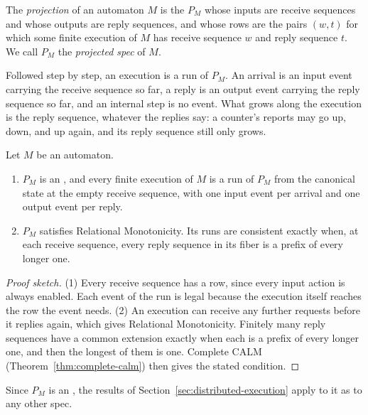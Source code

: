 \begin{definition}
\label{def:projection}
The \emph{projection} of an automaton $M$ is the \spectype $P_M$ whose inputs
are receive sequences and whose outputs are reply sequences, and whose rows
are the pairs $(w,t)$ for which some finite execution of $M$ has receive
sequence $w$ and reply sequence $t$.  We call $P_M$ the \emph{projected spec}
of $M$.
\end{definition}

Followed step by step, an execution is a run of $P_M$.  An arrival is an input
event carrying the receive sequence so far, a reply is an output event carrying
the reply sequence so far, and an internal step is no event.  What grows along
the execution is the reply sequence, whatever the replies say: a counter's
reports may go up, down, and up again, and its reply sequence still only
grows.

\begin{proposition}[Projection]
\label{prop:projection}
Let $M$ be an automaton.
\begin{enumerate}
  \item $P_M$ is an \spectype, and every finite execution of $M$ is a run of
        $P_M$ from the canonical state at the empty receive sequence, with
        one input event per arrival and one output event per reply.
  \item $P_M$ satisfies Relational Monotonicity.  Its runs are consistent
        exactly when, at each receive sequence, every reply sequence in its
        fiber is a prefix of every longer one.
\end{enumerate}
\end{proposition}

\begin{proof}[Proof sketch]
(1) Every receive sequence has a row, since every input action is always
enabled.  Each event of the run is legal because the execution itself reaches
the row the event needs.  (2) An execution can receive any further requests
before it replies again, which gives Relational Monotonicity.  Finitely many
reply sequences have a common extension exactly when each is a prefix of every
longer one, and then the longest of them is one.  Complete CALM
(Theorem~\ref{thm:complete-calm}) then gives the stated condition.
\end{proof}

Since $P_M$ is an \spectype, the results of
Section~\ref{sec:distributed-execution} apply to it as to any other spec.

